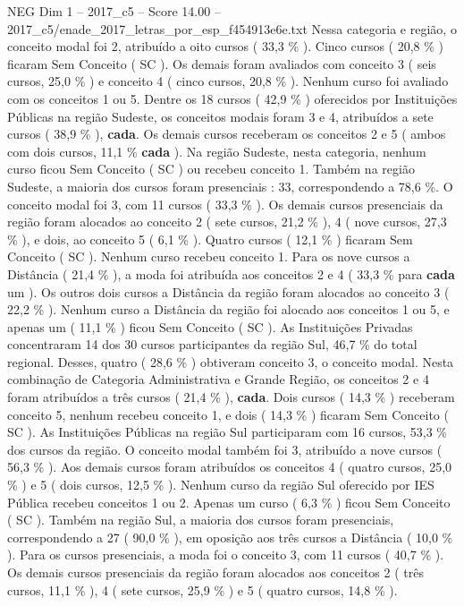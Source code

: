 \begin{textsample}{NEG Dim 1 – 2017\_c5 – Score 14.00 – 2017\_c5/enade\_2017\_letras\_por\_esp\_f454913e6e.txt}
Nessa categoria e região, o conceito modal foi 2, atribuído a oito cursos ( 33,3 \% ).
Cinco cursos ( 20,8 \% ) ficaram Sem Conceito ( SC ).
Os demais foram avaliados com conceito 3 ( seis cursos, 25,0 \% ) e conceito 4 ( cinco cursos, 20,8 \% ).
Nenhum curso foi avaliado com os conceitos 1 ou 5.
Dentre os 18 cursos ( 42,9 \% ) oferecidos por Instituições Públicas na região Sudeste, os conceitos modais foram 3 e 4, atribuídos a sete cursos ( 38,9 \% ), \textbf{cada}.
Os demais cursos receberam os conceitos 2 e 5 ( ambos com dois cursos, 11,1 \% \textbf{cada} ).
Na região Sudeste, nesta categoria, nenhum curso ficou Sem Conceito ( SC ) ou recebeu conceito 1.
Também na região Sudeste, a maioria dos cursos foram presenciais : 33, correspondendo a 78,6 \%.
O conceito modal foi 3, com 11 cursos ( 33,3 \% ).
Os demais cursos presenciais da região foram alocados ao conceito 2 ( sete cursos, 21,2 \% ), 4 ( nove cursos, 27,3 \% ), e dois, ao conceito 5 ( 6,1 \% ).
Quatro cursos ( 12,1 \% ) ficaram Sem Conceito ( SC ).
Nenhum curso recebeu conceito 1.
Para os nove cursos a Distância ( 21,4 \% ), a moda foi atribuída aos conceitos 2 e 4 ( 33,3 \% para \textbf{cada} um ).
Os outros dois cursos a Distância da região foram alocados ao conceito 3 ( 22,2 \% ).
Nenhum curso a Distância da região foi alocado aos conceitos 1 ou 5, e apenas um ( 11,1 \% ) ficou Sem Conceito ( SC ).
As Instituições Privadas concentraram 14 dos 30 cursos participantes da região Sul, 46,7 \% do total regional.
Desses, quatro ( 28,6 \% ) obtiveram conceito 3, o conceito modal.
Nesta combinação de Categoria Administrativa e Grande Região, os conceitos 2 e 4 foram atribuídos a três cursos ( 21,4 \% ), \textbf{cada}.
Dois cursos ( 14,3 \% ) receberam conceito 5, nenhum recebeu conceito 1, e dois ( 14,3 \% ) ficaram Sem Conceito ( SC ).
As Instituições Públicas na região Sul participaram com 16 cursos, 53,3 \% dos cursos da região.
O conceito modal também foi 3, atribuído a nove cursos ( 56,3 \% ).
Aos demais cursos foram atribuídos os conceitos 4 ( quatro cursos, 25,0 \% ) e 5 ( dois cursos, 12,5 \% ).
Nenhum curso da região Sul oferecido por IES Pública recebeu conceitos 1 ou 2.
Apenas um curso ( 6,3 \% ) ficou Sem Conceito ( SC ).
Também na região Sul, a maioria dos cursos foram presenciais, correspondendo a 27 ( 90,0 \% ), em oposição aos três cursos a Distância ( 10,0 \% ).
Para os cursos presenciais, a moda foi o conceito 3, com 11 cursos ( 40,7 \% ).
Os demais cursos presenciais da região foram alocados aos conceitos 2 ( três cursos, 11,1 \% ), 4 ( sete cursos, 25,9 \% ) e 5 ( quatro cursos, 14,8 \% ).

\end{textsample}
